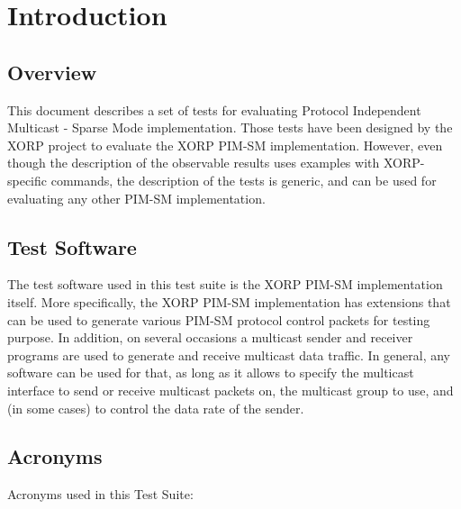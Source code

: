 \documentclass[11pt]{report}
\begin{document}
\setcounter{chapter}{-1}
\chapter{Introduction}

\section{Overview}

This document describes a set of tests for evaluating Protocol Independent
Multicast - Sparse Mode implementation. Those tests have been designed
by the XORP project to evaluate the XORP PIM-SM implementation.
However, even though the description of the observable results uses
examples with XORP-specific commands, the description of the tests is generic,
and can be used for evaluating any other PIM-SM implementation.

\section{Test Software}

The test software used in this test suite is the XORP PIM-SM implementation
itself. More specifically, the XORP PIM-SM implementation has extensions that
can be used to generate various PIM-SM protocol control packets for testing
purpose. In addition, on several occasions a multicast sender and receiver
programs are used to generate and receive multicast data traffic. In general,
any software can be used for that, as long as it allows to specify the
multicast interface to send or receive multicast packets on, the multicast
group to use, and (in some cases) to control the data rate of the sender.

\section{Acronyms}

Acronyms used in this Test Suite:
\end{document}
